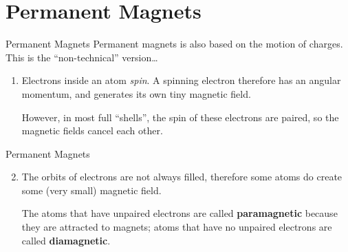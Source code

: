 \documentclass[12pt,aspectratio=169]{beamer}
\begin{document}
\section{Permanent Magnets}

\begin{frame}{Permanent Magnets}
  Permanent magnets is also based on the motion of charges. This is the
  ``non-technical'' version\ldots

  \begin{enumerate}
  \item Electrons inside an atom \emph{spin}. A spinning electron therefore has
    an angular momentum, and generates its own tiny magnetic field.
    \begin{center}
    \end{center}
    However, in most full ``shells'', the spin of these electrons are paired,
    so the magnetic fields cancel each other.
  \end{enumerate}
\end{frame}




\begin{frame}{Permanent Magnets}
  \begin{enumerate}
    \setcounter{enumi}{1}
  \item The orbits of electrons are not always filled, therefore some atoms do
    create some (very small) magnetic field.
    \begin{center}
    \end{center}
    The atoms that have unpaired electrons are called \textbf{paramagnetic}
    because they are attracted to magnets; atoms that have no unpaired
    electrons are called \textbf{diamagnetic}.
  \end{enumerate}
\end{frame}
\end{document}
